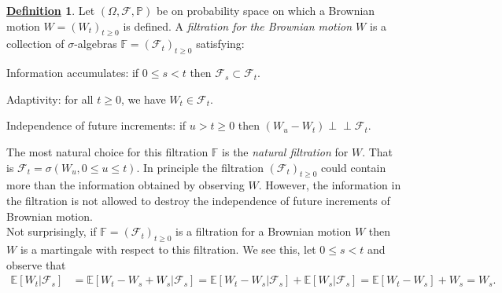 \documentclass[12pt]{book}
\numberwithin{equation}{chapter}
\theoremstyle{plain}
\numberwithin{theorem}{section}
\theoremstyle{definition}
\newtheorem{definition}[theorem]{\underline{Definition}}
\numberwithin{exercise}{chapter}
\newcommand{\<}{\langle}
\renewcommand{\>}{\rangle}
\renewcommand{\(}{\left(}
\renewcommand{\)}{\right)}
\renewcommand{\[}{\left[}
\renewcommand{\]}{\right]}
\newcommand\Eb{\mathds{E}}
\newcommand\Fb{\mathds{F}}
\newcommand\Pb{\mathds{P}}
\newcommand\Fc{\mathscr{F}}
\newcommand\Om{\Omega}
\newcommand\sig{\sigma}
\newcommand{\ind}{\perp \! \! \! \perp}
\begin{document}
\begin{definition}
\label{def:bm.filtration}
Let $(\Om, \Fc, \Pb)$ be on probability space on which a Brownian motion $W=(W_t)_{t \geq 0}$ is defined.  A \emph{filtration for the Brownian motion $W$} is a collection of $\sig$-algebras $\Fb=(\Fc_t)_{t \geq 0}$ satisfying:
\begin{enumerate*}
\item Information accumulates: if $0 \leq s < t$ then $\Fc_s \subset \Fc_t$.
\item Adaptivity: for all $t \geq 0$, we have $W_t \in \Fc_t$.
\item Independence of future increments: if $u>t \geq 0$ then $(W_u - W_t) \ind \Fc_t$.
\end{enumerate*}
\end{definition}

\noindent
The most natural choice for this filtration $\Fb$ is the \emph{natural filtration} for $W$.  That is $\Fc_t = \sig(W_u,0\leq u \leq t)$.  In principle the filtration $(\Fc_t)_{t \geq 0}$ could contain more than the information obtained by observing $W$.  However, the information in the filtration is not allowed to destroy the independence of future increments of Brownian motion.
\\[0.5em]
Not surprisingly, if $\Fb = (\Fc_t)_{t\geq 0}$ is a filtration for a Brownian motion $W$ then $W$ is a martingale with respect to this filtration.  We see this, let $0 \leq s < t$ and observe that
\begin{align}
\Eb[ W_t | \Fc_s ]
	&=	\Eb[ W_t - W_s + W_s | \Fc_s ]
	=		\Eb[ W_t - W_s | \Fc_s ] + \Eb[ W_s | \Fc_s ]
	=		\Eb[ W_t - W_s ] + W_s
	=		W_s .
\end{align}

\end{document}
